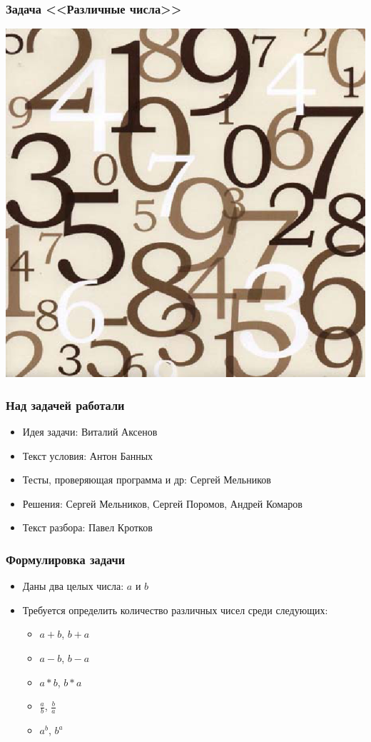 
\begin{frame}
  \frametitle{Задача <<Различные числа>>}
  \begin{center}
    \includegraphics{differ.eps}
  \end{center}
\end{frame}

\begin{frame}
  \frametitle{Над задачей работали}
  \begin{itemize}
    \item Идея задачи: Виталий Аксенов
    \item Текст условия: Антон Банных
    \item Тесты, проверяющая программа и др: Сергей Мельников
    \item Решения: Сергей Мельников, Сергей Поромов, Андрей Комаров
    \item Текст разбора: Павел Кротков
  \end{itemize}
\end{frame}

\begin{frame}
  \frametitle{Формулировка задачи}
  \begin{itemize}
    \item Даны два целых числа: $a$ и $b$
    \item Требуется определить количество различных чисел среди следующих:
      \begin{itemize}
        \item $a + b$, $b + a$
        \item $a - b$, $b - a$
        \item $a * b$, $b * a$
        \item $\frac{a}{b}$, $\frac{b}{a}$
        \item $a ^ b$, $b ^ a$
      \end{itemize}
  \end{itemize}
\end{frame}

